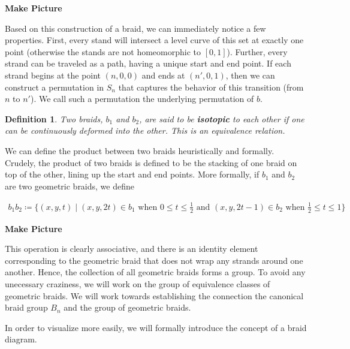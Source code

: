 \documentclass[10pt]{ucthesis}
\newtheorem{definition}{Definition}[chapter]
\begin{document}
\textbf{Make Picture}

Based on this construction of a braid, we can immediately notice a few properties. First, every stand will intersect a level curve of this set at exactly one point (otherwise the stands are not homeomorphic to $[0,1]$). Further, every strand can be traveled as a path, having a unique start and end point. If each strand begins at the point $(n,0,0)$ and ends at $(n',0,1)$, then we can construct a permutation in $S_n$ that captures the behavior of this transition (from $n$ to $n'$). We call such a permutation the underlying permutation of $b$.

\begin{definition}
	Two braids, $b_1$ and $b_2$, are said to be \textbf{isotopic} to each other if one can be continuously deformed into the other. This is an equivalence relation.
\end{definition}

We can define the product between two braids heuristically and formally. Crudely, the product of two braids is defined to be the stacking of one braid on top of the other, lining up the start and end points. More formally, if $b_1$ and $b_2$ are two geometric braids, we define 

\begin{equation}
\begin{aligned}
	b_1b_2 \coloneq \{(x,y,t)\mid (x,y,2t)\in b_1 \text{ when }0\leq t\leq \frac{1}{2} \text{ and }   (x,y,2t - 1)\in b_2 \text{ when }\frac{1}{2}\leq t\leq 1\}
\end{aligned}
\end{equation}

\textbf{Make Picture}

This operation is clearly associative, and there is an identity element corresponding to the geometric braid that does not wrap any strands around one another. Hence, the collection of all geometric braids forms a group. To avoid any unecessary craziness, we will work on the group of equivalence classes of geometric braids. We will work towards establishing the connection the canonical braid group $B_n$ and the group of geometric braids.

In order to visualize more easily, we will formally introduce the concept of a braid diagram.
\end{document}
